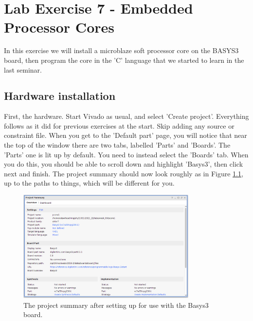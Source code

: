 \documentclass[../physical_computing.tex]{subfiles}
\begin{document}
\newcommand{\crlf}{\symbol{92}n\symbol{92}r}
\newcommand{\linefeed}{\symbol{92}n}

\chapter{Lab Exercise 7 - Embedded Processor Cores}
\label{sec:appendix_7}

In this exercise we will install a microblaze soft processor core on the BASYS3 board, then program the core in the 'C' language that we
started to learn in the last seminar. 

\section{Hardware installation}
\label{sec:hardware}

First, the hardware. Start Vivado as usual, and select 'Create project'. Everything follows as it did
for previous exercises at the start. Skip adding any source or constraint file. When you get to the 'Default part' page, you will notice that
near the top of the window there are two tabs, labelled 'Parts' and 'Boards'. The 'Parts' one is lit up by default. You need to instead select
the 'Boards' tab. When you do this, you should be able to scroll down and highlight 'Basys3', then click next and finish. The project summary
should now look roughly as in Figure \ref{fig:project1_summary}, up to the paths to things, which will be different for you.

\begin{figure}[h!]
    \centering
    \includegraphics[width=0.8\textwidth]{figures/project1_summary.png}
    \caption{The project summary after setting up for use with the Basys3 board.}
    \label{fig:project1_summary}
\end{figure}
\end{document}
